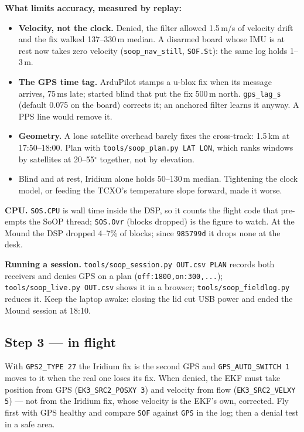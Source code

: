 \documentclass[11pt,a4paper]{article}
\newcommand{\file}[1]{\texttt{\small #1}}
\newcommand{\cmd}[1]{\texttt{\small #1}}
\begin{document}
\textbf{What limits accuracy, measured by replay:}
\begin{itemize}
\item \textbf{Velocity, not the clock.} Denied, the filter allowed 1.5\,m/s of velocity
  drift and the fix walked 137--330\,m median. A disarmed board whose IMU is at rest now
  takes zero velocity (\file{soop\_nav\_still}, \file{SOF.St}): the same log holds 1--3\,m.
\item \textbf{The GPS time tag.} ArduPilot stamps a u-blox fix when its message arrives,
  75\,ms late; started blind that put the fix 500\,m north. \file{gps\_lag\_s} (default
  0.075 on the board) corrects it; an anchored filter learns it anyway. A PPS line would
  remove it.
\item \textbf{Geometry.} A lone satellite overhead barely fixes the cross-track: 1.5\,km
  at 17:50--18:00. Plan with \cmd{tools/soop\_plan.py LAT LON}, which ranks windows by
  satellites at 20--55$^\circ$ together, not by elevation.
\item Blind and at rest, Iridium alone holds 50--130\,m median. Tightening the clock model,
  or feeding the TCXO's temperature slope forward, made it worse.
\end{itemize}

\textbf{CPU.} \file{SOS.CPU} is wall time inside the DSP, so it counts the flight code that
pre-empts the SoOP thread; \file{SOS.Ovr} (blocks dropped) is the figure to watch. At the
Mound the DSP dropped 4--7\% of blocks; since \file{985799d} it drops none at the desk.

\textbf{Running a session.} \cmd{tools/soop\_session.py OUT.csv PLAN} records both receivers
and denies GPS on a plan (\file{off:1800,on:300,...}); \cmd{tools/soop\_live.py OUT.csv}
shows it in a browser; \cmd{tools/soop\_fieldlog.py} reduces it. Keep the laptop awake:
closing the lid cut USB power and ended the Mound session at 18:10.

\subsection{Step 3 --- in flight}

With \file{GPS2\_TYPE 27} the Iridium fix is the second GPS and \file{GPS\_AUTO\_SWITCH 1}
moves to it when the real one loses its fix. When denied, the EKF must take position from GPS
(\file{EK3\_SRC2\_POSXY 3}) and velocity from flow (\file{EK3\_SRC2\_VELXY 5}) --- not from
the Iridium fix, whose velocity is the EKF's own, corrected. Fly first with GPS healthy and
compare \file{SOF} against \file{GPS} in the log; then a denial test in a safe area.
\end{document}

